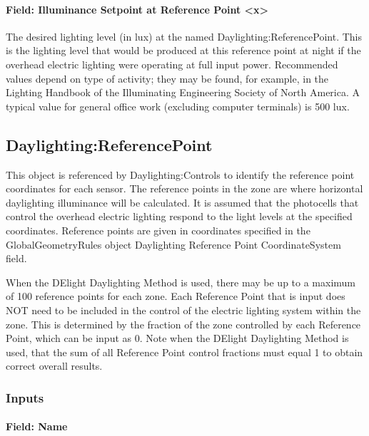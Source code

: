 \paragraph{Field: Illuminance Setpoint at Reference Point <x>}\label{field-illuminance-setpoint-at-reference-point-x}

The desired lighting level (in lux) at the named Daylighting:ReferencePoint. This is the lighting level that would be produced at this reference point at night if the overhead electric lighting were operating at full input power. Recommended values depend on type of activity; they may be found, for example, in the Lighting Handbook of the Illuminating Engineering Society of North America. A typical value for general office work (excluding computer terminals) is 500 lux.

\subsection{Daylighting:ReferencePoint}\label{daylightingreferencepoint-000}

This object is referenced by Daylighting:Controls to identify the reference point coordinates for each sensor. The reference points in the zone are where horizontal daylighting illuminance will be calculated. It is assumed that the photocells that control the overhead electric lighting respond to the light levels at the specified coordinates. Reference points are given in coordinates specified in the GlobalGeometryRules object Daylighting Reference Point CoordinateSystem field. 

When the DElight Daylighting Method is used, there may be up to a maximum of 100 reference points for each zone. Each Reference Point that is input does NOT need to be included in the control of the electric lighting system within the zone. This is determined by the fraction of the zone controlled by each Reference Point, which can be input as 0. Note when the DElight Daylighting Method is used, that the sum of all Reference Point control fractions must equal 1 to obtain correct overall results.

\subsubsection{Inputs}\label{inputs-010}

\paragraph{Field: Name}\label{field-name-002}

